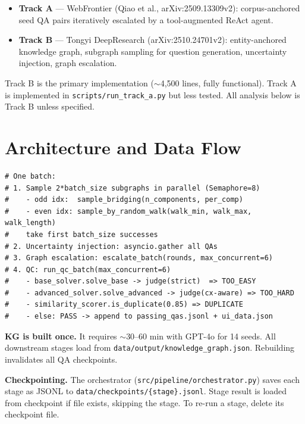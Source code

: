 \documentclass[11pt,a4paper]{article}
\begin{document}
\begin{itemize}[leftmargin=*,noitemsep]
  \item \textbf{Track A} — WebFrontier (Qiao et al., arXiv:2509.13309v2): corpus-anchored seed QA pairs iteratively escalated by a tool-augmented ReAct agent.
  \item \textbf{Track B} — Tongyi DeepResearch (arXiv:2510.24701v2): entity-anchored knowledge graph, subgraph sampling for question generation, uncertainty injection, graph escalation.
\end{itemize}

Track B is the primary implementation ($\sim$4,500 lines, fully functional). Track A is implemented in \texttt{scripts/run\_track\_a.py} but less tested. All analysis below is Track B unless specified.

\section{Architecture and Data Flow}
\label{sec:arch}

\begin{lstlisting}[style=py, caption=Track B pipeline (generate\_until\_pass.py)]
# One batch:
# 1. Sample 2*batch_size subgraphs in parallel (Semaphore=8)
#    - odd idx:  sample_bridging(n_components, per_comp)
#    - even idx: sample_by_random_walk(walk_min, walk_max, walk_length)
#    take first batch_size successes
# 2. Uncertainty injection: asyncio.gather all QAs
# 3. Graph escalation: escalate_batch(rounds, max_concurrent=6)
# 4. QC: run_qc_batch(max_concurrent=6)
#    - base_solver.solve_base -> judge(strict)  => TOO_EASY
#    - advanced_solver.solve_advanced -> judge(cx-aware) => TOO_HARD
#    - similarity_scorer.is_duplicate(0.85) => DUPLICATE
#    - else: PASS -> append to passing_qas.jsonl + ui_data.json
\end{lstlisting}

\textbf{KG is built once.} It requires $\sim$30--60 min with GPT-4o for 14 seeds. All downstream stages load from \texttt{data/output/knowledge\_graph.json}. Rebuilding invalidates all QA checkpoints.

\textbf{Checkpointing.} The orchestrator (\texttt{src/pipeline/orchestrator.py}) saves each stage as JSONL to \texttt{data/checkpoints/\{stage\}.jsonl}. Stage result is loaded from checkpoint if file exists, skipping the stage. To re-run a stage, delete its checkpoint file.

\end{document}
